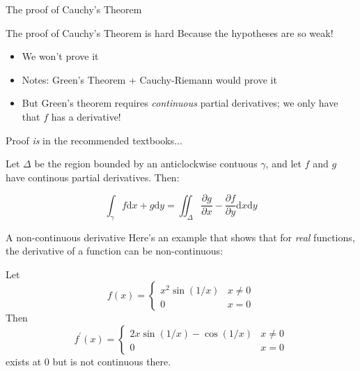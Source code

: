 \documentclass{beamer}
\begin{document}
\begin{frame}{The proof of Cauchy's Theorem}
\begin{block}{The proof of Cauchy's Theorem is hard}
Because the hypotheses are so weak!
\begin{itemize}
    \item We won't prove it
    \item Notes: Green's Theorem + Cauchy-Riemann would prove it
    \item But Green's theorem requires \emph{continuous} partial derivatives; we only have that $f$ has a derivative!
\end{itemize}
Proof \emph{is} in the recommended textbooks...
\end{block}
\begin{theorem}[Green]
  Let $\Delta$ be the region bounded by an anticlockwise contuous $\gamma$, and let $f$ and $g$ have continous partial derivatives.  Then:

  $$\int_\gamma f\textrm{d}x+g\textrm{d}y=\iint_\Delta \frac{\partial g}{\partial x}-\frac{\partial f}{\partial y}  \textrm{d}x\textrm{d}y$$

\end{theorem}


\end{frame}
\begin{frame}{A non-continuous derivative}
Here's an example that shows that for \emph{real} functions, the derivative of a function can be non-continuous:

\begin{example}
  Let
$$f(x)=\begin{cases}x^2\sin(1/x) & x\neq 0\\0 & x=0 \end{cases}$$
Then
$$f^\prime(x)=\begin{cases}2x\sin(1/x)-\cos(1/x) & x\neq 0\\0 & x=0 \end{cases}$$
exists at 0 but is not continuous there.

\end{example}

\end{frame}
\end{document}
